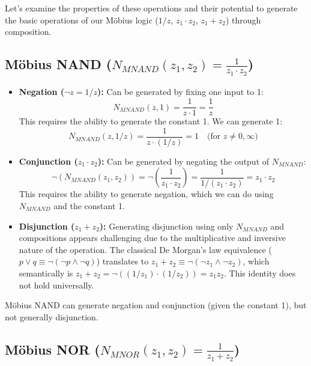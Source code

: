 	Let's examine the properties of these operations and their potential to generate the basic operations of our M\"{o}bius logic ($1/z$, $z_1 \cdot z_2$, $z_1 + z_2$) through composition.

	\subsection{Möbius NAND ($N_{MNAND}(z_1, z_2) = \frac{1}{z_1 \cdot z_2}$)}

	\begin{itemize}
		\item \textbf{Negation ($\neg z = 1/z$):} Can be generated by fixing one input to 1:
		$$N_{MNAND}(z, 1) = \frac{1}{z \cdot 1} = \frac{1}{z}$$
		This requires the ability to generate the constant 1. We can generate 1:
		$$N_{MNAND}(z, 1/z) = \frac{1}{z \cdot (1/z)} = 1 \quad \text{(for } z \neq 0, \infty)$$
		\item \textbf{Conjunction ($z_1 \cdot z_2$):} Can be generated by negating the output of $N_{MNAND}$:
		$$\neg(N_{MNAND}(z_1, z_2)) = \neg\left(\frac{1}{z_1 \cdot z_2}\right) = \frac{1}{1/(z_1 \cdot z_2)} = z_1 \cdot z_2$$
		This requires the ability to generate negation, which we can do using $N_{MNAND}$ and the constant 1.
		\item \textbf{Disjunction ($z_1 + z_2$):} Generating disjunction using only $N_{MNAND}$ and compositions appears challenging due to the multiplicative and inversive nature of the operation. The classical De Morgan's law equivalence ($p \vee q \equiv \neg(\neg p \wedge \neg q)$) translates to $z_1 + z_2 \equiv \neg(\neg z_1 \wedge \neg z_2)$, which semantically is $z_1 + z_2 = \neg((1/z_1) \cdot (1/z_2)) = z_1 z_2$. This identity does not hold universally.
	\end{itemize}
	M\"{o}bius NAND can generate negation and conjunction (given the constant 1), but not generally disjunction.

	\subsection{Möbius NOR ($N_{MNOR}(z_1, z_2) = \frac{1}{z_1 + z_2}$)}

